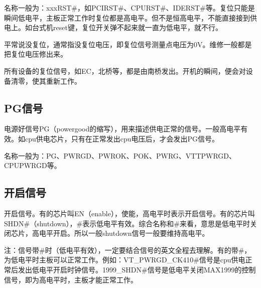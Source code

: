 名称一般为：xxxRST\#，如PCIRST\#、CPURST\#、IDERST\#等。复位只能是瞬间低电平，主板正常工作时复位都是高电平。但不是恒高电平，不能直接接到供电上。如台式机reset键，复位开关弹不起来就一直为低电平，就不行。

平常说没复位，通常指没复位电压，即复位信号测量点电压为0V。维修一般都是把复位电压修出来。

所有设备的复位信号，如EC，北桥等，都是由南桥发出。开机的瞬间，便会对设备清零，使其重新工作。

\subsection{PG信号}
电源好信号PG（powergood的缩写），用来描述供电正常的信号。一般高电平有效。如cpu供电芯片，只有在正常发出cpu电压后，才会发出PG信号。

名称一般为：PG、PWRGD、PWROK、POK、PWRG、VTTPWRGD、CPUPWRGD等。

\subsection{开启信号}
开启信号。有的芯片叫EN（enable），使能，高电平时表示开启信号。有的芯片叫SHDN\#（shutdown），\#表示低电平有效。综合名称和\#来看，意思是低电平时关闭芯片，高电平开启。所以一般shutdown信号一般要维持高电平。

注：信号带\#时（低电平有效），一定要结合信号的英文全程去理解。有的带\#，为低电平时主板可以正常工作。例如：VT\_PWRGD\_CK410\#信号是cpu供电正常后发出低电平开启时钟信号。1999\_SHDN\#信号是低电平关闭MAX1999的控制信号，即为高电平时，主板才能正常工作。
